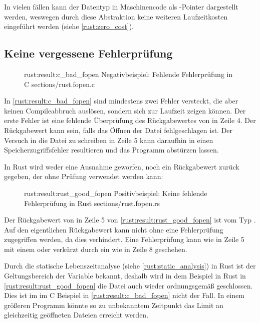 In vielen fällen kann der  Datentyp in Maschinencode als -Pointer dargestellt werden, weswegen durch diese Abstraktion keine weiteren Laufzeitkosten eingeführt werden \cite[100]{rust:orly_programming} (siehe \autoref{rust:zero_cost}).



\subsection{Keine vergessene Fehlerprüfung}
\label{rust:result}

\label{rust:panic}

\begin{figure}[H]
	\ccinclude
	{rust:result:c_bad_fopen}
	{Negativbeispiel: Fehlende Fehlerprüfung in C}
	{sections/rust.fopen.c}
\end{figure}

In \autoref{rust:result:c_bad_fopen} sind mindestens zwei Fehler versteckt, die aber keinen Compileabbruch auslösen, sondern sich zur Laufzeit zeigen können.
Der erste Fehler ist eine fehlende Überprüfung des Rückgabewertes von  in Zeile 4.
Der Rückgabewert kann  sein, falls das Öffnen der Datei fehlgeschlagen ist.
Der Versuch in die Datei zu schreiben in Zeile 5 kann daraufhin in einen Speicherzugriffsfehler resultieren und das Programm abstürzen lassen.

In Rust wird weder eine Ausnahme geworfen, noch ein Rückgabewert zurück gegeben, der ohne Prüfung verwendet werden kann:

\begin{figure}[H]
	\rustcinclude
		{rust:result:rust_good_fopen}
		{Positivbeispiel: Keine fehlende Fehlerprüfung in Rust}
		{sections/rust.fopen.rs}
\end{figure}

Der Rückgabewert von  in Zeile 5 von \autoref{rust:result:rust_good_fopen} ist vom Typ .
Auf den eigentlichen Rückgabewert  kann nicht ohne eine Fehlerprüfung zugegriffen werden, da dies  verhindert.
Eine Fehlerprüfung kann wie in Zeile 5 mit einem  oder verkürzt durch ein  wie in Zeile 8 geschehen.

Durch die statische Lebenszeitanalyse (siehe \autoref{rust:static_analysis}) in Rust ist der Geltungsbereich der  Variable bekannt, deshalb wird in dem Beispiel in Rust in \autoref{rust:result:rust_good_fopen} die Datei auch wieder ordnungsgemäß geschlossen.
Dies ist im im C Beispiel in \autoref{rust:result:c_bad_fopen} nicht der Fall.
In einem größeren Programm könnte so zu unbekanntem Zeitpunkt das Limit an gleichzeitig geöffneten Dateien erreicht werden.

